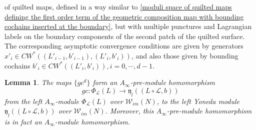 \documentclass{amsart}
\newtheorem{lemma}[theorem]{Lemma}
\numberwithin{equation}{section}
\numberwithin{figure}{section}
\begin{document}
of quilted maps, defined in a way similar to \eqref{moduli space of quilted maps defining the first order term of the geometric composition map with bounding cochains inserted at the boundary}, but with multiple punctures and Lagrangian labels on the boundary components of the second patch of the quilted surface. The corresponding asymptotic convergence conditions are given by generators $x'_{i} \in CW^{*}((L'_{i-1}, b'_{i-1}), (L'_{i}, b'_{i}))$, and also those given by bounding cochains $b'_{i} \in CW^{*}((L'_{i}, b'_{i})), i = 0, \cdots, d-1$. \par

\begin{lemma}
	The maps $\{gc^{d}\}$ form an $A_{\infty}$-pre-module homomorphism
\begin{equation}\label{geometric composition map}
gc: \Phi_{\mathcal{L}}(L) \to \mathfrak{y}_{l}((L \circ \mathcal{L}, b))
\end{equation}
from the left $A_{\infty}$-module $\Phi_{\mathcal{L}}(L)$ over $\mathcal{W}_{im}(N)$, to the left Yoneda module $\mathfrak{y}_{l}((L \circ \mathcal{L}, b))$ over $\mathcal{W}_{im}(N)$. Moreover, this $A_{\infty}$-pre-module homomorphism is in fact an $A_{\infty}$-module homomorphism.
\end{lemma}
\end{document}
